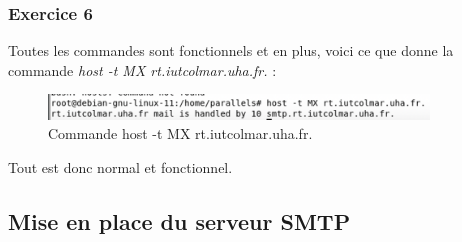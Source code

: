 \documentclass[12pt, a4paper]{article}
\begin{document}
        \subsubsection{Exercice 6}
        Toutes les commandes sont fonctionnels et en plus, 
        voici ce que donne la commande \textit{host -t MX rt.iutcolmar.uha.fr.} :
        \begin{figure}[H]
            \centering
            \includegraphics[width=0.9\textwidth]{../img/mx-host.png}
            \caption{Commande host -t MX rt.iutcolmar.uha.fr.}
            \label{fig:mx}
        \end{figure}
        Tout est donc normal et fonctionnel. 
        \newpage

    \subsection{Mise en place du serveur SMTP}
    
\end{document}
